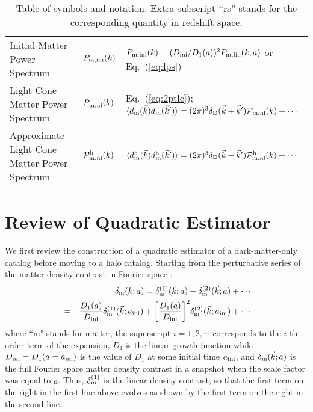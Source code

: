 \documentclass[prd,amsmath,amssymb,floatfix,superscriptaddress,nofootinbib,twocolumn]{revtex4-1}
\def\bea{\begin{eqnarray}}
\def\eea{\end{eqnarray}}
\newcommand{\ini}{\rm ini}
\newcommand{\vrr}{\vec{r}}
\newcommand{\vs}{\nonumber\\}
\newcommand{\vk}{\vec{k}}
\newcommand{\ec}[1]{Eq.~(\ref{eq:#1})}
\newcommand{\eql}[1]{\label{eq:#1}}
\begin{document}
\begin{table}[h!]
\begin{tabular}{ |p{7.5cm}||p{1.7 cm}|p{7.7cm}|  }
 Initial Matter Power Spectrum & $ P_{\rm m,ini}(k)$ & $P_{\rm m,ini}(k)=(D_{\ini}/D_{1}(a))^2P_{\rm m,lin}(k;a)$ or \ec{lps} \\
 Light Cone Matter Power Spectrum & $\mathcal{P}_{\rm m,nl}^{}(k)$ & \ec{2ptlc}; $\langle d_{\rm m} (\vk)d_{\rm m}(\vk')\rangle =(2\pi)^3 \delta_{\rm D}(\vk+\vk')\mathcal{P}_{\rm m,nl}(k)+\cdots$\\
 Approximate Light Cone Matter Power Spectrum & $\mathcal{P}_{\rm m,nl}^{\rm h}(k)$ &  $\langle d_{\rm m}^{\rm h} (\vk)d_{\rm m}^{\rm h}(\vk')\rangle = (2\pi)^3 \delta_{\rm D}(\vk+\vk')\mathcal{P}_{\rm m,nl}^{\rm h}(k)+\cdots$\\
 \hline
\end{tabular}
\caption{Table of symbols and notation. Extra subscript ``rs'' stands for the corresponding quantity in redshift space.}
\label{table:1}
\end{table}


\section{Review of Quadratic Estimator}

\noindent We first review the construction of a quadratic estimator of a dark-matter-only catalog \cite{Li:2020fir} before moving to a halo catalog. Starting from the perturbative series of the matter density contrast in Fourier space \cite{Jain:1994sop}\cite{Bernardeau:2002rev}:
\bea
&&\delta_{\rm m}(\vk;a)=\delta^{(1)}_{\rm m}(\vk;a)+\delta^{(2)}_{\rm m}(\vk;a)+\cdots\vs
&=&\frac{D_1(a)}{D_{\rm ini}}\delta^{(1)}_{\rm m}(\vk;a_{\ini})+\bigg[\frac{D_1(a)}{D_{\rm ini}}\bigg]^2\delta^{(2)}_{\rm m}(\vk;a_{\ini})+\cdots \eql{tayl}
\eea 
where ``m" stands for matter, the superscript $i=1,2,\cdots$ corresponds to the $i$-th order term of the expansion, $D_1$ is the linear growth function while $D_{\ini} = D_1(a=a_{\ini})$ is the value of $D_1$ at some initial time $a_{\rm ini}$, and $\delta_{\rm m}(\vk;a)$ is the full Fourier space matter density contrast in a snapshot when the scale factor was equal to $a$. Thus, $\delta_{\rm m}^{(1)}$ is the linear density contrast, so that the first term on the right in the first line above evolves as shown by the first term on the right in the second line.
\end{document}
